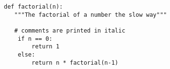 \documentclass[10pt]{article}
\newcommand{\code}[2]{
  \hrulefill
  \subsection*{#1}
  
  \vspace{2em}
}
\begin{document}
\begin{lstlisting}
def factorial(n):
   """The factorial of a number the slow way"""

   # comments are printed in italic
    if n == 0:
        return 1
    else:
        return n * factorial(n-1)
\end{lstlisting}

\end{document}
